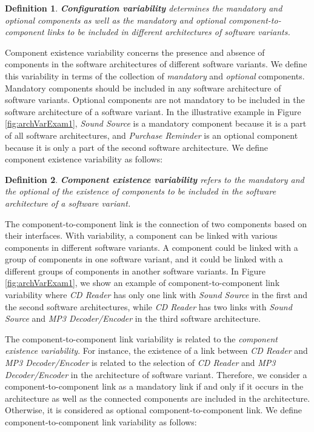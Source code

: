 \documentclass[graybox]{svmult}
\newtheorem{mydef}{Definition}
\begin{document}
\begin{mydef}
\textbf{Configuration variability} determines the mandatory and optional components as well as the  mandatory and optional component-to-component links to be included in different architectures of software variants.
\end{mydef}


Component existence variability concerns the presence and absence of components in the software architectures of different software variants. We define this variability in terms of the collection of \textit{mandatory} and \textit{optional} components. Mandatory components should be included in any software architecture of software variants. Optional components are not mandatory to be included in the software architecture of a software variant. In the illustrative example in Figure \ref{fig:archVarExam1}, \textit{Sound Source} is a mandatory component because it is a part of all software architectures, and \textit{Purchase Reminder} is an optional component because it is only a part of the second software architecture. We define component existence variability as follows:


\begin{mydef}
\textbf{Component existence variability} refers to the mandatory and the optional of the existence of components to be included in the software architecture of a software variant.
\end{mydef}


 The component-to-component link is the connection of two components based on their interfaces. With variability, a component can be linked with various components in different software variants. A component could be linked with a group of components in one software variant, and it could be linked with a different groups of components in another software variants. In Figure \ref{fig:archVarExam1}, we show an example of component-to-component link variability where \textit{CD Reader} has only one link with \textit{Sound Source} in the first and the second software architectures, while \textit{CD Reader} has two links with \textit{Sound Source} and \textit{MP3 Decoder/Encoder} in the third software architecture.

 
The component-to-component link variability is related to the \textit{component existence variability}. For instance, the existence of a link between \textit{CD Reader} and \textit{MP3 Decoder/Encoder} is related to the selection of \textit{CD Reader} and \textit{MP3 Decoder/Encoder} in the architecture of software variant. Therefore, we consider a component-to-component link as a mandatory link if and only if it occurs in the architecture as well as the connected components are included in the architecture. Otherwise, it is considered as optional component-to-component link. We define component-to-component link variability as follows:
\end{document}
